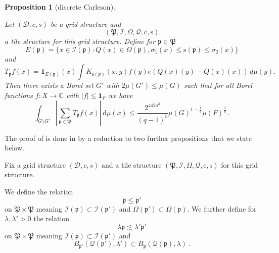 \documentclass[10pt,a4paper]{article}
\theoremstyle{plain}
\newtheorem{proposition}[theorem]{Proposition}
\theoremstyle{definition}
\numberwithin{equation}{subsection}
\newcommand{\fp}{{\mathfrak p}}
\newcommand{\fP}{{\mathfrak P}}
\newcommand{\pc}{{\mathrm{c}}}
\newcommand{\ps}{{\mathrm{s}}}
\newcommand{\fc}{{\Omega}}
\newcommand{\scI}{{\mathcal{I}}} %
\newcommand{\tQ}{{Q}}
\newcommand{\fcc}{{\mathcal{Q}}}
\newcommand{\lean}[1]{}
\newcommand{\uses}[1]{}
\newcommand{\leanok}{}
\def\C{\mathbb{C}}
\begin{document}
\begin{proposition}[discrete Carleson]
\label{discrete-Carleson}
\leanok
\lean{discrete_carleson}
\uses{exceptional-set, forest-union, forest-complement}
Let $(\mathcal{D}, c, s)$ be a grid structure and
\begin{equation*}
    (\fP,\scI,\fc,\fcc,\pc,\ps)
\end{equation*}
a tile structure for this grid structure.
Define for $\fp\in \fP$
\begin{equation}\label{defineep}
    E(\fp)=\{x\in \scI(\fp): \tQ(x)\in \fc(\fp) , {\sigma_1}(x)\le \ps(\fp)\le {\sigma_2}(x)\}
\end{equation}
and
\begin{equation}\label{definetp}
    T_{\fp} f(x)= \mathbf{1}_{E(\fp)}(x) \int K_{\ps(\fp)}(x,y) f(y) e(\tQ(x)(y)-\tQ(x)(x))\, d\mu(y).
\end{equation}
Then there exists a Borel set $G'$ with $2\mu(G') \leq \mu(G)$ such that for all Borel functions $f:X\to \C$ with $|f|\le \mathbf{1}_F$
we have
\begin{equation}
    \label{disclesssim}
   \int_{G \setminus G'} \left| \sum_{\fp \in \fP} T_{\fp} f (x) \right| \, \mathrm{d}\mu(x) \le \frac{2^{442a^3}}{(q-1)^5} \mu(G)^{1-\frac{1}{q}} \mu(F)^{\frac{1}{q}}\,.
\end{equation}
\end{proposition}









The proof of  is done in 
by a reduction to two further propositions that we state below.


Fix a grid structure $(\mathcal{D}, c, s)$ and a tile structure $(\fP,\scI,\fc,\fcc,\pc,\ps)$
for this grid structure.

We define the relation
\begin{equation}\label{straightorder}
    \fp\le \fp'
\end{equation}
 on $\fP\times \fP$ meaning
$\scI(\fp)\subset \scI(\fp')$ and
$\Omega(\fp')\subset \Omega(\fp)$.
We further define for $\lambda,\lambda' >0$
the relation
\begin{equation}\label{wiggleorder}
    \lambda \fp \lesssim \lambda' \fp'
\end{equation}
on $\fP\times \fP$ meaning
$\scI(\fp)\subset \scI(\fp')$ and
\begin{equation}
    B_{\fp'}(\fcc(\fp'),\lambda') \subset B_{\fp}(\fcc(\fp),\lambda)\, .
\end{equation}
\end{document}
